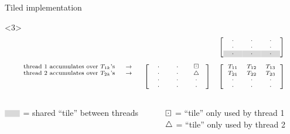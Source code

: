 \documentclass[14pt]{beamer}
\begin{document}
\begin{frame}{Tiled implementation}
\begin{onlyenv}
\begin{onlyenv}<3>
\[
\scriptsize
\begin{array}{ccc}
&& \left[\begin{array}{ccc}
\ \ \cdot \ \ & \ \ \cdot \ \  & \ \ \cdot \ \ \\
\ \ \cdot \ \ & \ \ \cdot \ \  & \ \ \cdot \ \ \\
\ \ \cl{\cdot} \ \ & \ \ \cl{\cdot} \ \  & \ \ \cl{\cdot} \ \ \\
\end{array}\right]\\
\\
\begin{array}{r}
\text{thread 1 accumulates over $T_{1k}$'s} \ \ \ \ \rw\\
\text{thread 2 accumulates over $T_{2k}$'s} \ \ \ \ \rw\\
\\
\\
\end{array}
& \left[\begin{array}{ccc}
\ \ \cdot \ \ & \ \ \cdot \ \ & \bd \\
\ \ \cdot \ \ & \ \ \cdot \ \ & \uptri \\
\ \ \cdot \ \ & \ \ \cdot \ \  & \ \ \cdot \ \ \\
\ \ \cdot \ \ & \ \ \cdot \ \  & \ \ \cdot \ \ \\
\end{array}\right]
& \left[\begin{array}{ccc}
T_{11} & T_{12} & T_{13} \\
T_{21} & T_{22} & T_{23} \\
\ \ \cdot \ \ & \ \ \cdot \ \  & \ \ \cdot \ \ \\
\ \ \cdot \ \ & \ \ \cdot \ \  & \ \ \cdot \ \ \\
\end{array}\right]
\end{array}
\]
\end{onlyenv}

\vspace{0.3cm}

\begin{columns}
\begin{column}{0.5\textwidth}
\footnotesize
$\scriptsize\begin{array}{c}\cl{\ \ \ }\end{array}$ = shared ``tile'' between threads
\end{column}
\begin{column}{0.5\textwidth}
\footnotesize
$\boxdot$ = ``tile'' only used by thread 1\\
$\bigtriangleup$ = ``tile'' only used by thread 2
\end{column}
\end{columns}
\end{onlyenv}


\end{frame}
\end{document}

